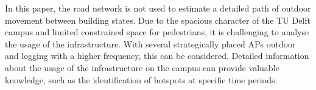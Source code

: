 In this paper, the road network is not used to estimate a detailed path of outdoor movement between building states. Due to the spacious character of the TU Delft campus and limited constrained space for pedestrians, it is challenging to analyse the usage of the infrastructure. With several strategically placed APs outdoor and logging with a higher frequency, this can be considered. Detailed information about the usage of the infrastructure on the campus can provide valuable knowledge, such as the identification of hotspots at specific time periods. 
